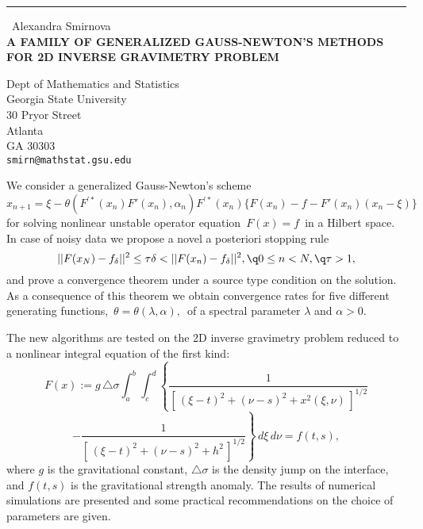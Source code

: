 \documentclass{report}
\begin{document}
\begin{center}
\rule{6in}{1pt} \
{\large Alexandra Smirnova \\
{\bf A FAMILY OF GENERALIZED GAUSS-NEWTON'S METHODS FOR 2D INVERSE GRAVIMETRY PROBLEM}}

Dept of Mathematics and Statistics \\ Georgia State University \\ 30 Pryor Street \\ Atlanta \\ GA 30303
\\
{\tt smirn@mathstat.gsu.edu}\end{center}

We consider a generalized Gauss-Newton's scheme
$$
x_{n+1}=\xi-\theta(F^{\prime*}(x_n)F'(x_n),\alpha_n)F^{\prime*}(x_n)\{F(x_n)-f-F'(x_n)(x_n-\xi)\}
$$
for solving nonlinear unstable operator equation $\,F(x)=f\,$ in a
Hilbert space. In case of noisy data we propose a novel a
posteriori stopping rule
$$
||F(x_N)-f_\delta||^2\le \tau \delta <||F(x_n)-f_\delta||^2,\q 0\le n< N,\q
\tau >1,
$$
and prove a convergence theorem under a source type condition on the
solution. As a consequence of this theorem we obtain convergence
rates for five different generating functions, $\,\theta=\theta(\lambda,\alpha),\,$
of a spectral parameter $\lambda$ and $\alpha>0$.

The new algorithms are tested on the 2D inverse gravimetry problem
reduced to a nonlinear integral equation of the first kind:
$$
F(x):=g \,\triangle \sigma
\int^b_a\int^d_c\left\{\frac{1}{[\,(\xi-t)^2+(\nu-s)^2+x^2(\xi,\nu)\,]^{1/2}}\right.
$$
$$
\left.-
\frac{1}{[\,(\xi-t)^2+(\nu-s)^2+h^2\,]^{1/2}}\right\}\,d\xi\,d\nu =
f(t,s),
$$
where $g$ is the gravitational constant, $\triangle \sigma$ is the
density jump on the interface, and $f(t,s)$ is the gravitational
strength anomaly. The
results of numerical simulations are presented and some practical
recommendations on the choice of parameters are given.
\end{document}

